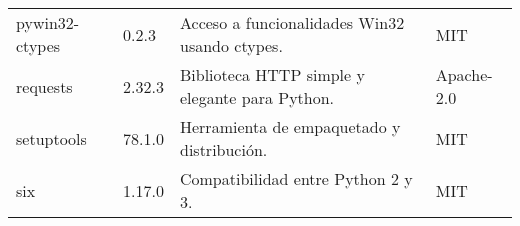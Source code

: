 \begin{longtable}[]{@{}llll@{}}
    \begin{minipage}[t]{0.18\columnwidth}\raggedright\strut pywin32-ctypes \strut \end{minipage} & \begin{minipage}[t]{0.10\columnwidth}\raggedright\strut 0.2.3 \strut \end{minipage} & \begin{minipage}[t]{0.49\columnwidth}\raggedright\strut Acceso a funcionalidades Win32 usando ctypes. \strut \end{minipage} & \begin{minipage}[t]{0.11\columnwidth}\raggedright\strut MIT \strut \end{minipage} \tabularnewline

    \begin{minipage}[t]{0.18\columnwidth}\raggedright\strut requests \strut \end{minipage} & \begin{minipage}[t]{0.10\columnwidth}\raggedright\strut 2.32.3 \strut \end{minipage} & \begin{minipage}[t]{0.49\columnwidth}\raggedright\strut Biblioteca HTTP simple y elegante para Python. \strut \end{minipage} & \begin{minipage}[t]{0.11\columnwidth}\raggedright\strut Apache-2.0 \strut \end{minipage} \tabularnewline

    \begin{minipage}[t]{0.18\columnwidth}\raggedright\strut setuptools \strut \end{minipage} & \begin{minipage}[t]{0.10\columnwidth}\raggedright\strut 78.1.0 \strut \end{minipage} & \begin{minipage}[t]{0.49\columnwidth}\raggedright\strut Herramienta de empaquetado y distribución. \strut \end{minipage} & \begin{minipage}[t]{0.11\columnwidth}\raggedright\strut MIT \strut \end{minipage} \tabularnewline

    \begin{minipage}[t]{0.18\columnwidth}\raggedright\strut six \strut \end{minipage} & \begin{minipage}[t]{0.10\columnwidth}\raggedright\strut 1.17.0 \strut \end{minipage} & \begin{minipage}[t]{0.49\columnwidth}\raggedright\strut Compatibilidad entre Python 2 y 3. \strut \end{minipage} & \begin{minipage}[t]{0.11\columnwidth}\raggedright\strut MIT \strut \end{minipage} \tabularnewline


\end{longtable}
